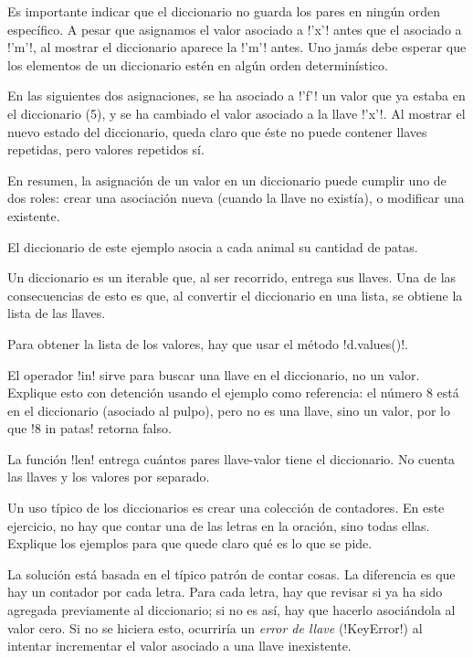\documentclass[10pt]{article}
\begin{document}
  Es importante indicar que el diccionario no guarda los pares
  en ningún orden específico.
  A pesar que asignamos el valor asociado a \li!'x'! antes que el asociado a \li!'m'!,
  al mostrar el diccionario aparece la \li!'m'! antes.
  Uno jamás debe esperar que los elementos de un diccionario
  estén en algún orden determinístico.

  En las siguientes dos asignaciones,
  se ha asociado a \li!'f'! un valor que ya estaba en el diccionario (5),
  y se ha cambiado el valor asociado a la llave \li!'x'!.
  Al mostrar el nuevo estado del diccionario,
  queda claro que éste no puede contener llaves repetidas,
  pero valores repetidos sí.

  En resumen,
  la asignación de un valor en un diccionario
  puede cumplir uno de dos roles:
  crear una asociación nueva (cuando la llave no existía),
  o modificar una existente.


  El diccionario de este ejemplo
  asocia a cada animal su cantidad de patas.

  Un diccionario es un iterable que,
  al ser recorrido, entrega sus llaves.
  Una de las consecuencias de esto
  es que, al convertir el diccionario en una lista,
  se obtiene la lista de las llaves.

  Para obtener la lista de los valores,
  hay que usar el método \li!d.values()!.

  El operador \li!in! sirve para buscar una llave en el diccionario,
  no un valor.
  Explique esto con detención usando el ejemplo como referencia:
  el número 8 está en el diccionario (asociado al pulpo),
  pero no es una llave, sino un valor,
  por lo que \li!8 in patas! retorna falso.

  La función \li!len! entrega cuántos pares llave-valor tiene el diccionario.
  No cuenta las llaves y los valores por separado.


  Un uso típico de los diccionarios
  es crear una colección de contadores.
  En este ejercicio,
  no hay que contar una de las letras en la oración,
  sino todas ellas.
  Explique los ejemplos para que quede claro qué es lo que se pide.

  La solución está basada en el típico patrón de contar cosas.
  La diferencia es que hay un contador por cada letra.
  Para cada letra, hay que revisar si ya ha sido agregada previamente al diccionario;
  si no es así, hay que hacerlo asociándola al valor cero.
  Si no se hiciera esto,
  ocurriría un \emph{error de llave} (\li!KeyError!)
  al intentar incrementar el valor asociado a una llave inexistente.
\end{document}
